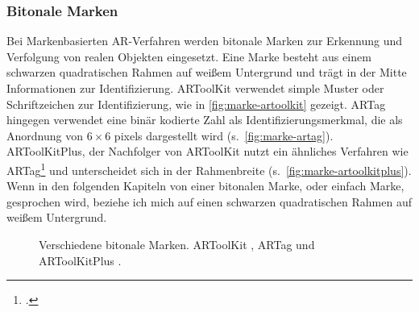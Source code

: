 \subsubsection{Bitonale Marken}
\label{sub:bitonalemarken}
Bei Markenbasierten \gls{AR}-Verfahren werden bitonale Marken zur Erkennung und Verfolgung von realen Objekten
 eingesetzt. Eine Marke besteht aus einem schwarzen quadratischen Rahmen auf weißem Untergrund und trägt in der Mitte
 Informationen zur Identifizierung. ARToolKit verwendet simple Muster oder Schriftzeichen zur Identifizierung, wie in
 \autoref{fig:marke-artoolkit} gezeigt. ARTag hingegen verwendet eine binär kodierte Zahl als Identifizierungsmerkmal,
 die als Anordnung von $6 \times 6$ \glspl{pixel} dargestellt wird (s.~\autoref{fig:marke-artag}). ARToolKitPlus, der
 Nachfolger von ARToolKit nutzt ein ähnliches Verfahren wie ARTag\footcite[Vgl.][S.~142]{wagner07b} und unterscheidet
 sich in der Rahmenbreite (s.~\autoref{fig:marke-artoolkitplus}). Wenn in den folgenden Kapiteln von einer bitonalen
 Marke, oder einfach Marke, gesprochen wird, beziehe ich mich auf einen schwarzen quadratischen Rahmen auf weißem
 Untergrund.

\begin{figure}[!ht]
	\centering
	\caption{Verschiedene bitonale Marken.
		ARToolKit , ARTag  und ARToolKitPlus .
	}
	\label{fig:bitonale-marken}
\end{figure}

\begin{comment}
	(wagner/schmalstieg ARToolKitPlus fpr Pose Tracking on Mobile Devices S.4)

	Beim Fiducial Marker Tracking werden künstliche Marken zur Erkennung und Verfolgung von realen Objekten eingesetzt. Häufig werden für diese Marken quadratische schwarze Rahmen verwendet die innerhalb des Rahmens Schriftzeichen, Bilder oder 2D Codes enthalten. Diese Marken sind einfach herzustellen und können mit geringem Aufwand an Objekte angebracht werden.

	Diese bitonale Marken haben den Vorteil, dass sie Robust gegen Helligkeitsveränderung sind und die Entscheidung eines Pixels auf eine Schwellwert-Entscheidung reduziert werden kann. Marken für \gls{AR} müssen in einem großen Blickfeld erkannt werden können, was wiederum bei industriellen Anwendung nicht der Fall ist, da hier Marken den größten Teil des Bildes einnehmen können.
\end{comment}

